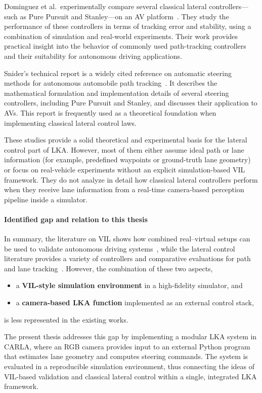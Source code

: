 Dominguez et al.\ experimentally compare several classical lateral controllers---such as Pure Pursuit and Stanley---on an \ac{AV} platform~\cite{7795743}. They study the performance of these controllers in terms of tracking error and stability, using a combination of simulation and real-world experiments. Their work provides practical insight into the behavior of commonly used path-tracking controllers and their suitability for autonomous driving applications.

Snider's technical report is a widely cited reference on automatic steering methods for autonomous automobile path tracking~\cite{Snider2009AutomaticSM}. It describes the mathematical formulation and implementation details of several steering controllers, including Pure Pursuit and Stanley, and discusses their application to \acsp{AV}. This report is frequently used as a theoretical foundation when implementing classical lateral control laws.

These studies provide a solid theoretical and experimental basis for the lateral control part of \ac{LKA}. However, most of them either assume ideal path or lane information (for example, predefined waypoints or ground-truth lane geometry) or focus on real-vehicle experiments without an explicit simulation-based \ac{VIL} framework. They do not analyze in detail how classical lateral controllers perform when they receive lane information from a real-time camera-based perception pipeline inside a simulator.

\paragraph{Identified gap and relation to this thesis}
In summary, the literature on \ac{VIL} shows how combined real--virtual setups can be used to validate autonomous driving systems~\cite{electronics11244073, survey_test_bench, xiong_hu}, while the lateral control literature provides a variety of controllers and comparative evaluations for path and lane tracking~\cite{kebbati, ARTUNEDO2024100910, 7795743, Snider2009AutomaticSM}. However, the combination of these two aspects,
\begin{itemize}
    \item a \textbf{\acs{VIL}-style simulation environment} in a high-fidelity simulator, and
    \item a \textbf{camera-based \acs{LKA} function} implemented as an external control stack,
\end{itemize}
is less represented in the existing works.

The present thesis addresses this gap by implementing a modular \ac{LKA} system in CARLA, where an RGB camera provides input to an external Python program that estimates lane geometry and computes steering commands. The system is evaluated in a reproducible simulation environment, thus connecting the ideas of \ac{VIL}-based validation and classical lateral control within a single, integrated \ac{LKA} framework.
